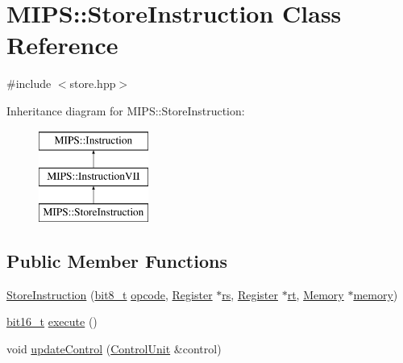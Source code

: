 \hypertarget{classMIPS_1_1StoreInstruction}{}\section{M\+I\+PS\+:\+:Store\+Instruction Class Reference}
\label{classMIPS_1_1StoreInstruction}


{\ttfamily \#include $<$store.\+hpp$>$}

Inheritance diagram for M\+I\+PS\+:\+:Store\+Instruction\+:\begin{figure}[H]
\begin{center}
\leavevmode
\includegraphics[height=3.000000cm]{classMIPS_1_1StoreInstruction}
\end{center}
\end{figure}
\subsection*{Public Member Functions}
\begin{DoxyCompactItemize}
\item 
\hyperlink{classMIPS_1_1StoreInstruction_ab828ac11fad6c5d8ccf5faca8016232e}{Store\+Instruction} (\hyperlink{core_8hpp_a6074bae122ae7b527864eec42c728c3c}{bit8\+\_\+t} \hyperlink{classMIPS_1_1Instruction_a45cc6808b5dde8a5d41067d148b55476}{opcode}, \hyperlink{classMIPS_1_1Register}{Register} $\ast$\hyperlink{classMIPS_1_1InstructionVII_a8e51202e0b22f8e74668f6de95089e60}{rs}, \hyperlink{classMIPS_1_1Register}{Register} $\ast$\hyperlink{classMIPS_1_1InstructionVII_a8710c06b6e7816f330b0c5daea3402a4}{rt}, \hyperlink{classMIPS_1_1Memory}{Memory} $\ast$\hyperlink{classMIPS_1_1InstructionVII_a4fb34750bedbf137b43f9b55b591e0d7}{memory})
\item 
\hyperlink{core_8hpp_adc265a970bc35995b5879784bbb3f1b7}{bit16\+\_\+t} \hyperlink{classMIPS_1_1StoreInstruction_a8a341407465c275b74c1e067f9dd6459}{execute} ()
\item 
void \hyperlink{classMIPS_1_1StoreInstruction_ab91c709e160c274abd7fe1660cd8fa52}{update\+Control} (\hyperlink{classMIPS_1_1ControlUnit}{Control\+Unit} \&control)
\end{DoxyCompactItemize}
